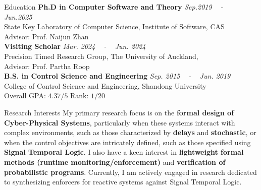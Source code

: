 \documentclass[
	10pt, %
]{resume} %
\begin{document}

\begin{rSection}{Education}
    \textbf{Ph.D in Computer Software and Theory} \hfill \textit{Sep.2019 ~ - ~ Jun.2025}\\
    State Key Laboratory of Computer Science, Institute of Software, CAS \smallskip \\ 
	Advisor: Prof. Naijun Zhan 
	\medskip\\
	\textbf{Visiting Scholar} \hfill \textit{Mar. 2024 ~ - ~ Jun. 2024}\\
	Precision Timed Research Group, The University of Auckland, \\
	Advisor: Prof. Partha Roop
	\medskip\\
	\textbf{B.S. in Control Science and Engineering} \hfill \textit{Sep. 2015 ~ - ~ Jun. 2019} \\ 
	College of Control Science and Engineering, Shandong University \smallskip\\
	Overall GPA: $4.37/5$ \quad Rank: $1/20$

\end{rSection}


\begin{rSection}{Research Interests}
	My primary research focus is on the \textbf{formal design of Cyber-Physical Systems}, particularly when these systems interact with complex environments, such as those characterized by \textbf{delays} and \textbf{stochastic}, or when the control objectives are intricately defined, such as those specified using \textbf{Signal Temporal Logic}.
	I also have a keen interest in \textbf{lightweight formal methods (runtime monitoring/enforcement)} and \textbf{verification of probabilistic programs}.
	Currently, I am actively engaged in research dedicated to synthesizing enforcers for reactive systems against Signal Temporal Logic.
\end{rSection}
\end{document}
